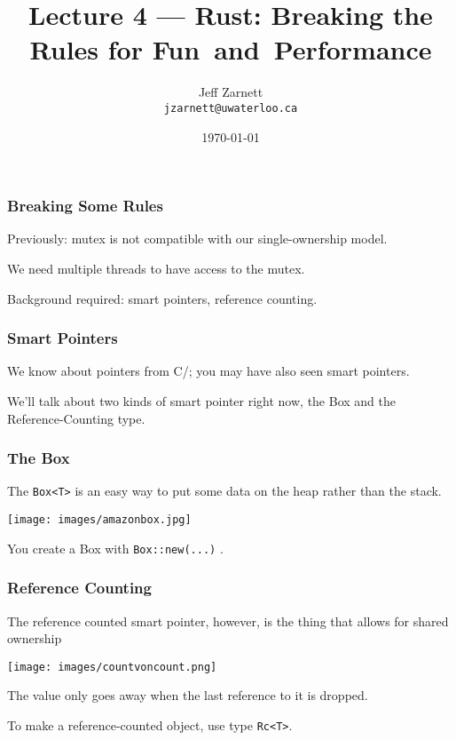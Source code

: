 


\title{Lecture 4 --- Rust: Breaking the Rules for Fun~and~Performance  }

\author{Jeff Zarnett \\ \small \texttt{jzarnett@uwaterloo.ca}}
\date{\today}




\begin{frame}
  \titlepage

 \end{frame}
 

\begin{frame}
\frametitle{Breaking Some Rules}

Previously: mutex is not compatible with our single-ownership model.

We need multiple threads to have access to the mutex.

Background required: smart pointers, reference counting.

\end{frame}


\begin{frame}
\frametitle{Smart Pointers}
We know about pointers from C/\CPP; you may have also seen smart pointers.

We'll talk about two kinds of smart pointer right now, the Box and the Reference-Counting type.

\end{frame}


\begin{frame}
\frametitle{The Box}

The \texttt{Box<T>} is an easy way to put some data on the heap rather than the stack.

\begin{center}
	\texttt{[image: images/amazonbox.jpg]}
\end{center}

You create a Box with \texttt{Box::new(...)} .
\end{frame}


\begin{frame}
\frametitle{Reference Counting}

The reference counted smart pointer, however, is the thing that allows for shared ownership

\begin{center}
	\texttt{[image: images/countvoncount.png]}
\end{center}

The value only goes away when the last reference to it is dropped.

To make a reference-counted object, use type \texttt{Rc<T>}.

\end{frame}


